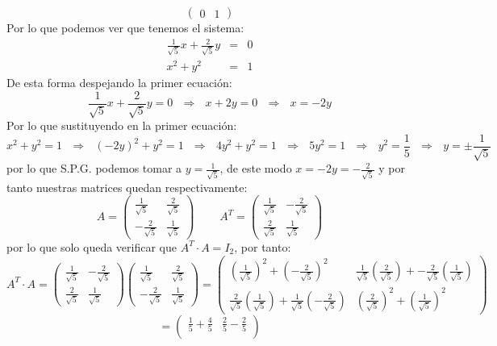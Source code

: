 \begin{itemize}
\[\begin{pmatrix}
    0 & 1\end{pmatrix}\]
    Por lo que podemos ver que tenemos el sistema:
    \begin{eqnarray*}
    \frac{1}{\sqrt{5}}x+\frac{2}{\sqrt{5}}y&=&0\\
    x^2+y^2&=&1
    \end{eqnarray*}
    De esta forma despejando la primer ecuaci\'on:
    \[\frac{1}{\sqrt{5}}x+\frac{2}{\sqrt{5}}y=0~~~\Longrightarrow~~~x+2y=0~~~\Longrightarrow~~~x=-2y\]
    Por lo que sustituyendo en la primer ecuaci\'on:
    \[x^2+y^2=1~~~\Longrightarrow~~~(-2y)^2+y^2=1~~~\Longrightarrow~~~4y^2+y^2=1~~~\Longrightarrow~~~5y^2=1~~~\Longrightarrow~~~y^2=\frac{1}{5}~~~\Longrightarrow~~~y=\pm\frac{1}{\sqrt{5}}\]
    por lo que S.P.G. podemos tomar a $\displaystyle y= \frac{1}{\sqrt{5}}$, de este modo $x=-2y=-\frac{2}{\sqrt{5}}$ y por tanto nuestras matrices quedan respectivamente:
    \[A=\begin{pmatrix}
    \frac{1}{\sqrt{5}} & \frac{2}{\sqrt{5}}\\
    -\frac{2}{\sqrt{5}} & \frac{1}{\sqrt{5}}\end{pmatrix}~~~~~~~~~~A^{T}=\begin{pmatrix}
    \frac{1}{\sqrt{5}} & -\frac{2}{\sqrt{5}}\\
    \frac{2}{\sqrt{5}} & \frac{1}{\sqrt{5}}\end{pmatrix}\]
    por lo que solo queda verificar que $A^T\cdot A=I_2$, por tanto:
    \[A^T\cdot A=\begin{pmatrix}
    \frac{1}{\sqrt{5}} & -\frac{2}{\sqrt{5}}\\
    \frac{2}{\sqrt{5}} & \frac{1}{\sqrt{5}}\end{pmatrix}\begin{pmatrix}
    \frac{1}{\sqrt{5}} & \frac{2}{\sqrt{5}}\\
    -\frac{2}{\sqrt{5}} & \frac{1}{\sqrt{5}}\end{pmatrix}=\begin{pmatrix}
    \left(\frac{1}{\sqrt{5}}\right)^2+\left(-\frac{2}{\sqrt{5}}\right)^2 & \frac{1}{\sqrt{5}}\left(\frac{2}{\sqrt{5}}\right)+-\frac{2}{\sqrt{5}}\left(\frac{1}{\sqrt{5}}\right)\\
    \frac{2}{\sqrt{5}}\left(\frac{1}{\sqrt{5}}\right)+\frac{1}{\sqrt{5}}\left(-\frac{2}{\sqrt{5}}\right) & \left(\frac{2}{\sqrt{5}}\right)^2+\left(\frac{1}{\sqrt{5}}\right)^2\end{pmatrix}\]\[=\begin{pmatrix}
    \frac{1}{5}+\frac{4}{5} & \frac{2}{5}-\frac{2}{5}\\

\end{pmatrix}\]
\end{itemize}
